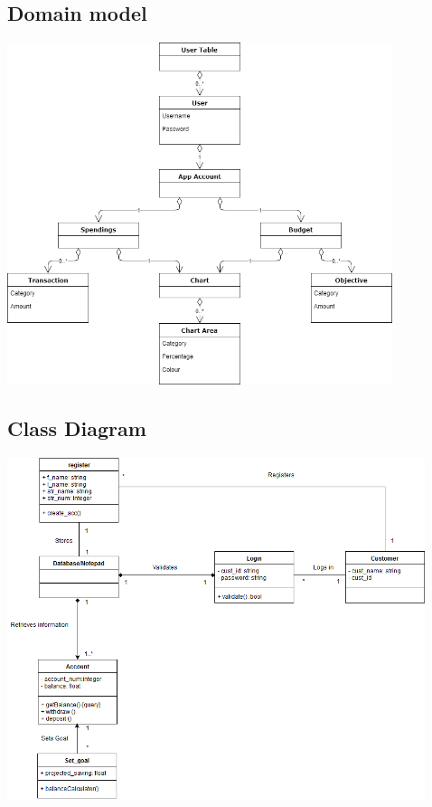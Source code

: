\documentclass[letterpaper]{article}
\begin{document}
	\newpage
	
	\subsection{Domain model}
	
		\begin{center}
			\includegraphics[height=10cm]{DomainModel}
		\end{center}
	
	\newpage
	
	\subsection{Class Diagram}
	
		\begin{center}
			\includegraphics[height=10cm]{Classdiagram}
		\end{center}
	
\end{document}
